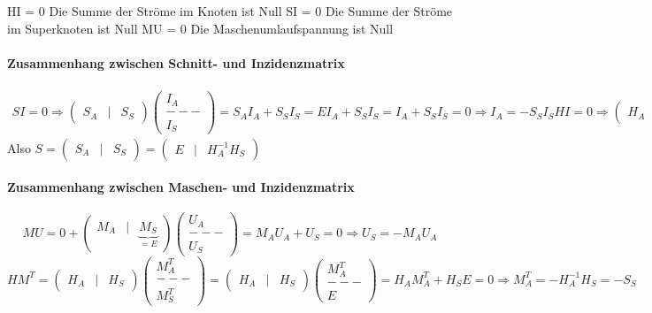 \documentclass[german]{article}
\begin{document}
HI = 0 Die Summe der Ströme im Knoten ist Null
SI = 0 Die Summe der Ströme im Superknoten ist Null
MU = 0 Die Maschenumlaufspannung ist Null

\paragraph{Zusammenhang zwischen Schnitt- und Inzidenzmatrix}
\[
	\left. \begin{array}{l}
	SI = 0 \Rightarrow \begin{pmatrix} S_A & | & S_S \end{pmatrix} \begin{pmatrix} I_A \\ --- \\ I_S \end{pmatrix} = S_A I_A + S_S I_S = E I_A + S_S I_S = I_A + S_S I_S = 0 \Rightarrow I_A = - S_S I_S
	HI = 0 \Rightarrow \begin{pmatrix} H_A & | & H_S \end{pmatrix} \begin{pmatrix} I_A \\ --- \\ I_S \end{pmatrix} = H_A I_A + H_S I_S = 0 \Rightarrow I_A = -H_A^{-1} H_S I_S
	\end{array} \right\} \Rightarrow S_S = H_A^{-1} H_S
\]
Also $S = \begin{pmatrix} S_A & | & S_S \end{pmatrix} = \begin{pmatrix} E & | & H_A^{-1} H_S \end{pmatrix}$

\paragraph{Zusammenhang zwischen Maschen- und Inzidenzmatrix}
\[
	MU = 0 + \begin{pmatrix} M_A & | & \underbrace{M_S}_{=E} \end{pmatrix} \begin{pmatrix} U_A \\ --- \\ U_S \end{pmatrix} = M_A U_A + U_S = 0 \Rightarrow U_S = - M_A U_A
\]
\[
	H M^T = \begin{pmatrix} H_A & | & H_S \end{pmatrix} \begin{pmatrix} M_A^T \\ --- \\ M_S^T \end{pmatrix} = \begin{pmatrix} H_A & | & H_S \end{pmatrix} \begin{pmatrix} M_A^T \\ --- \\ E \end{pmatrix} = H_A M_A^T + H_S E = 0 \Rightarrow M_A^T = -H_A^{-1} H_S = -S_S
\]
\end{document}
